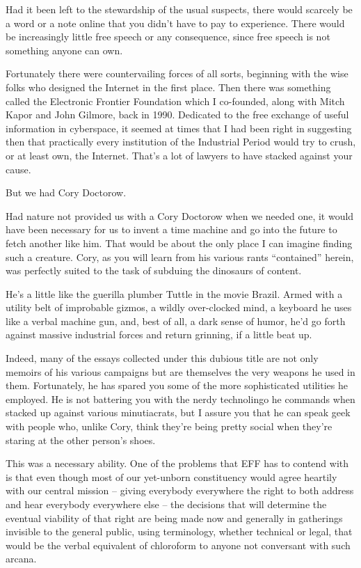 Had it been left to the stewardship of the usual suspects, there
would scarcely be a word or a note online that you didn't have to
pay to experience. There would be increasingly little free speech
or any consequence, since free speech is not something anyone can
own.

Fortunately there were countervailing forces of all sorts,
beginning with the wise folks who designed the Internet in the
first place. Then there was something called the Electronic
Frontier Foundation which I co-founded, along with Mitch Kapor and
John Gilmore, back in 1990. Dedicated to the free exchange of
useful information in cyberspace, it seemed at times that I had
been right in suggesting then that practically every institution of
the Industrial Period would try to crush, or at least own, the
Internet. That's a lot of lawyers to have stacked against your
cause.

But we had Cory Doctorow.

Had nature not provided us with a Cory Doctorow when we needed one,
it would have been necessary for us to invent a time machine and go
into the future to fetch another like him. That would be about the
only place I can imagine finding such a creature. Cory, as you will
learn from his various rants ``contained'' herein, was perfectly
suited to the task of subduing the dinosaurs of content.

He's a little like the guerilla plumber Tuttle in the movie Brazil.
Armed with a utility belt of improbable gizmos, a wildly
over-clocked mind, a keyboard he uses like a verbal machine gun,
and, best of all, a dark sense of humor, he'd go forth against
massive industrial forces and return grinning, if a little beat
up.

Indeed, many of the essays collected under this dubious title are
not only memoirs of his various campaigns but are themselves the
very weapons he used in them. Fortunately, he has spared you some
of the more sophisticated utilities he employed. He is not
battering you with the nerdy technolingo he commands when stacked
up against various minutiacrats, but I assure you that he can speak
geek with people who, unlike Cory, think they're being pretty
social when they're staring at the other person's shoes.

This was a necessary ability. One of the problems that EFF has to
contend with is that even though most of our yet-unborn
constituency would agree heartily with our central mission -- giving
everybody everywhere the right to both address and hear everybody
everywhere else -- the decisions that will determine the eventual
viability of that right are being made now and generally in
gatherings invisible to the general public, using terminology,
whether technical or legal, that would be the verbal equivalent of
chloroform to anyone not conversant with such arcana.

